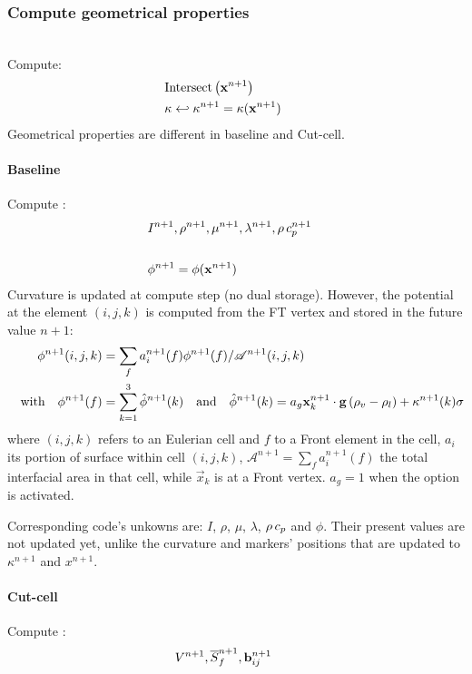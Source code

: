 \documentclass[]{article}
\begin{document}
\subsubsection{Compute geometrical properties}
 \\
Compute:
\begin{align*} 
	&\mathrm{Intersect}\lrp{\ve{x}^{n+1}} \quad &\code{  --> gp_->parcourir();} \\
	& \kappa \into \kappa^{n+1}=\kappa(\ve{x}^{n+1}) \quad &\code{  --> maillage.calculer_courbure();}
\end{align*}
Geometrical properties are different in baseline and Cut-cell. 
\paragraph{Baseline}
Compute : 
\begin{align*} 
	&I^{n+1}, \rho^{n+1}, \mu^{n+1},  \lambda^{n+1}, \rhoCp^{n+1} &\code{  --> gp_->compute();} &\\ 
	& &\code{ ou gp_->calculer_rho_mu_indic...();} &\\
	& \phi^{n+1}=\phi(\ve{x}^{n+1}) \quad &\code{  --> gp_.calculer_potentiel();} &
\end{align*}
Curvature is updated at compute step (no dual storage). However, the potential at the element $(i,j,k)$ is computed from the FT vertex and stored in the future value ${n+1}$:
\begin{align*}
	\phi^{n+1}(i,j,k) &= \sum_f a_i^{n+1}(f) \phi^{n+1}(f)/\mathcal{A}^{n+1}(i,j,k) \\
	\qq{with} \phi^{n+1}(f) &= \sum_{k=1}^3 \hat{\phi}^{n+1}(k) \qetq 
	\hat{\phi}^{n+1}(k)= a_g\vec{x}_k^{n+1}\cdot \vec{g} \lrp{\rho_v - \rho_l} + \kappa^{n+1}(k) \sigma  
\end{align*}
where $(i,j,k)$ refers to an Eulerian cell and $f$ to a Front element in the cell, $a_i$ its portion of surface within cell $(i,j,k)$, $\mathcal{A}^{n+1}=\sum_f a_i^{n+1}(f)$ the total interfacial area in that cell, while $\vec{x}_k$ is at a Front vertex. $a_g=1$ when the option  is activated.

Corresponding code's unkowns are: $I$, $\rho$, $\mu$, $\lambda$, $\rhoCp$ and $\phi$. Their present values are not updated yet, unlike the curvature and markers' positions that are updated to $\kappa^{n+1}$ and $x^{n+1}$.

\paragraph{Cut-cell}
Compute : 
\begin{align} 
	&V^{n+1}, \f{S}_f^{n+1}, \ve{b}_{ij}^{n+1} \quad \code{  --> gp_->xxxx();}
\end{align}
\end{document}
